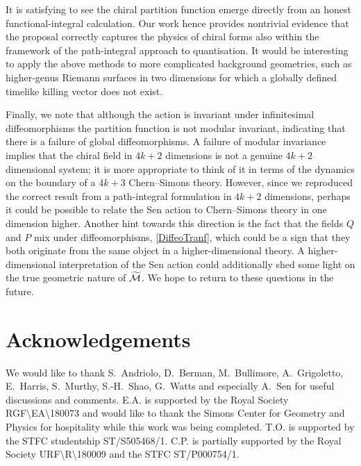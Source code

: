 \documentclass[11pt]{article}
\numberwithin{equation}{section}
\begin{document}
It is satisfying to see the chiral partition function emerge directly from an honest functional-integral calculation. Our work hence provides nontrivial evidence that the proposal \cite{Sen:2015nph,Sen:2019qit} correctly captures the physics of chiral forms also within the framework of the path-integral approach to quantisation. It would be interesting to apply the above methods to more complicated background geometries, such as higher-genus Riemann surfaces in two dimensions for which a globally defined timelike killing vector does not exist.

Finally, we note that although the action is invariant under infinitesimal diffeomorphisms the partition function is not modular invariant, indicating that there is a failure of global diffeomorphisms. A failure of modular invariance implies that the chiral field in $4k+2$ dimensions is not a genuine $4k+2$ dimensional system; it is more appropriate to think of it in terms of the dynamics on the boundary of a $4k+3$ Chern--Simons theory. However, since we reproduced the correct result from a  path-integral formulation in $4k+2$ dimensions, perhaps it could be possible to relate the Sen action to Chern--Simons theory in one dimension higher. Another hint towards this direction is the fact that the fields $Q$ and $P$ mix under diffeomorphisms, \eqref{DiffeoTranf}, which could be a sign that they both originate from the same object in a higher-dimensional theory. A higher-dimensional interpretation of the Sen action could additionally shed some light on the true geometric nature of $\widetilde{\cal M}$. We hope to return to these questions in the future.


\section*{Acknowledgements}

We would like to thank S.~Andriolo, D.~Berman, M.~Bullimore, A.~Grigoletto, E.~Harris, S.~Murthy, S.-H.~Shao, G.~Watts and especially A.~Sen for useful discussions and comments. E.A. is supported by the Royal Society RGF\textbackslash EA\textbackslash 180073 and would like to thank the Simons Center for Geometry and Physics for hospitality while this work was being completed.  T.O. is supported by the STFC studentship ST/S505468/1. C.P. is partially supported by the Royal Society URF\textbackslash R\textbackslash 180009 and the STFC  ST/P000754/1.
\end{document}
